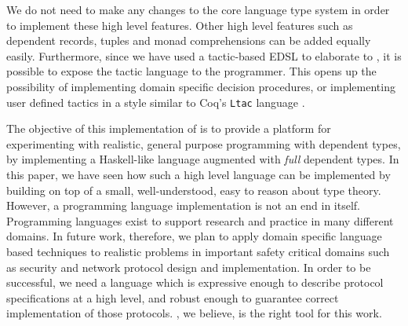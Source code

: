 We do not need to make any changes to the core language type system in order to 
implement these high level features. 
Other high level features such as dependent records, tuples and monad comprehensions
can be added equally easily.  Furthermore, 
since we have used a tactic-based EDSL to elaborate \Idris{} to \TT{}, it is
possible to expose the tactic language to the programmer. This opens up the
possibility of implementing domain specific decision procedures, or implementing
user defined tactics in a style similar to Coq's \texttt{Ltac} language \cite{Bertot2004}.

The objective of this implementation of \Idris{} is to provide a platform
for experimenting with realistic, general purpose programming with dependent
types, by implementing a Haskell-like language augmented with \emph{full}
dependent types.  
In this paper, we have seen how such a high level language can be implemented
by building on top of a small, well-understood, easy to reason about type
theory. However, a programming language implementation is not an end in itself. 
Programming languages exist to support research and practice in many different
domains. In future work, therefore, we plan to apply domain specific
language based techniques to realistic problems
in important safety critical domains such as security and network protocol
design and implementation. In order to be successful, we need a language which
is expressive enough to describe protocol specifications at a high level, and robust 
enough to guarantee correct implementation of those protocols. \Idris{}, we believe,
is the right tool for this work.




